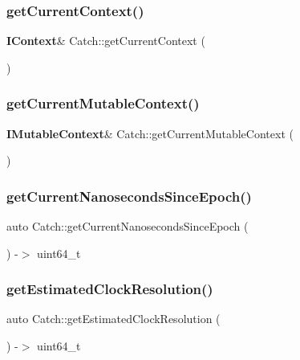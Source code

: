 \mbox{\label{namespace_catch_ad517cca9b21deb79101e90e5508dd161}} 
\subsubsection{getCurrentContext()}
{\footnotesize\ttfamily \textbf{ I\+Context}\& Catch\+::get\+Current\+Context (\begin{DoxyParamCaption}{ }\end{DoxyParamCaption})\hspace{0.3cm}{\ttfamily [inline]}}

\mbox{\label{namespace_catch_af7bb0c32ab2453d2f53e92a96d15360e}} 
\subsubsection{getCurrentMutableContext()}
{\footnotesize\ttfamily \textbf{ I\+Mutable\+Context}\& Catch\+::get\+Current\+Mutable\+Context (\begin{DoxyParamCaption}{ }\end{DoxyParamCaption})\hspace{0.3cm}{\ttfamily [inline]}}

\mbox{\label{namespace_catch_a98d058468488c486a9cb5c8463f3ba29}} 
\subsubsection{getCurrentNanosecondsSinceEpoch()}
{\footnotesize\ttfamily auto Catch\+::get\+Current\+Nanoseconds\+Since\+Epoch (\begin{DoxyParamCaption}{ }\end{DoxyParamCaption}) -\/$>$  uint64\+\_\+t}

\mbox{\label{namespace_catch_ac8e1ed37624bd0d97b2c0d4ec099d31f}} 
\subsubsection{getEstimatedClockResolution()}
{\footnotesize\ttfamily auto Catch\+::get\+Estimated\+Clock\+Resolution (\begin{DoxyParamCaption}{ }\end{DoxyParamCaption}) -\/$>$  uint64\+\_\+t}

